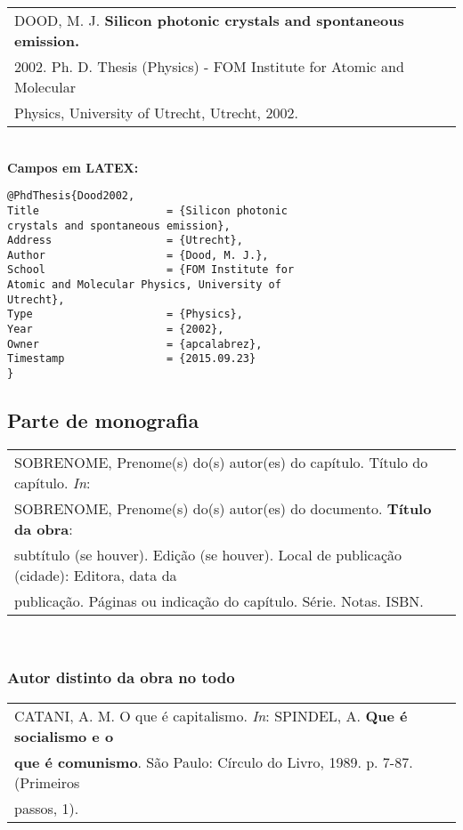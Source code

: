 \begin{tabular}{|l|c|} \hline
	DOOD, M. J. \textbf{Silicon photonic crystals and spontaneous emission.} \\ 2002.
	 Ph. D. Thesis (Physics) - FOM Institute for Atomic and Molecular
	 \\ Physics, University of Utrecht, Utrecht, 2002.    \\\hline
\end{tabular} \\

\textbf{Campos em LATEX:} \\

\begin{verbatim}
@PhdThesis{Dood2002,
Title                    = {Silicon photonic
crystals and spontaneous emission},
Address                  = {Utrecht},
Author                   = {Dood, M. J.},
School                   = {FOM Institute for
Atomic and Molecular Physics, University of
Utrecht},
Type                     = {Physics},
Year                     = {2002},
Owner                    = {apcalabrez},
Timestamp                = {2015.09.23}
}
\end{verbatim}

\subsection{Parte de monografia}	

\begin{tabular}{|l|c|} \hline
	SOBRENOME, Prenome(s) do(s) autor(es) do capítulo. Título do capítulo. \textit{In}: \\ SOBRENOME, Prenome(s) do(s) autor(es) do documento. \textbf{Título da obra}: \\ subtítulo (se houver). Edição (se houver). Local de publicação (cidade): Editora, data da\\ publicação. Páginas ou indicação do capítulo. Série. Notas. ISBN.     \\\hline
\end{tabular} \\

\subsubsection{Autor distinto da obra no todo} 

\begin{tabular}{|l|c|} \hline
	CATANI, A. M. O que é capitalismo. \textit{In}: SPINDEL, A. \textbf{Que é socialismo e o}\\ \textbf{que é comunismo}. São Paulo: Círculo do Livro, 1989. p. 7-87. (Primeiros \\passos, 1).    \\\hline
\end{tabular} \\

